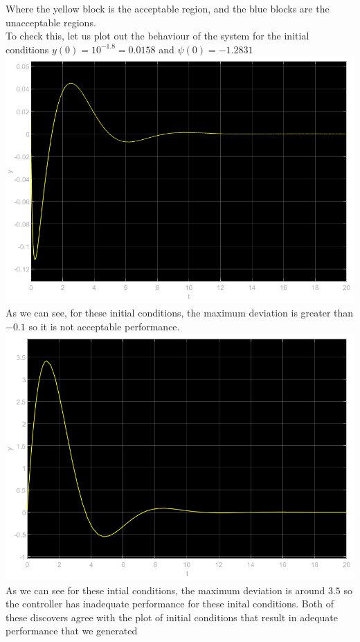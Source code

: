 \documentclass[12pt]{article}
\begin{document}
Where the yellow block is the acceptable region, and the blue blocks are the unacceptable regions.\\
To check this, let us plot out the behaviour of the system for the initial conditions $y(0)=10^{-1.8}=0.0158$ and $\psi(0)=-1.2831$\\
\includegraphics[scale=0.4]{Problem3Fig2.png}\\
As we can see, for these initial conditions, the maximum deviation is greater than $-0.1$ so it is not acceptable performance.
\\\includegraphics[scale=0.4]{Problem3Fig3.png}\\
As we can see for these intial conditions, the maximum deviation is around $3.5$ so the controller has inadequate performance for these inital conditions. Both of these discovers agree with the plot of initial conditions
that result in adequate performance that we generated
\end{document}
